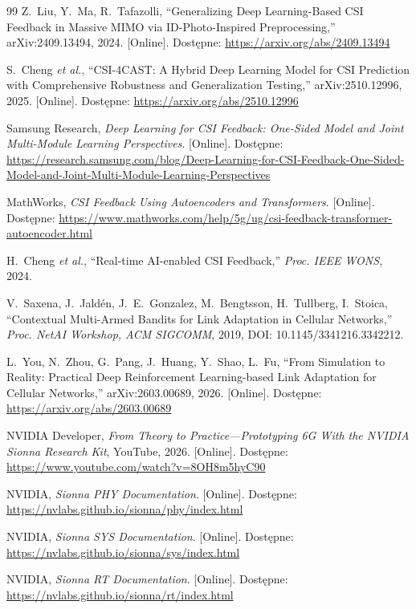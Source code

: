 \documentclass[12pt, a4paper]{article}
\begin{document}
\begin{thebibliography}{99}
Z.~Liu, Y.~Ma, R.~Tafazolli, ``Generalizing Deep Learning-Based CSI Feedback in Massive MIMO via ID-Photo-Inspired Preprocessing,'' arXiv:2409.13494, 2024. [Online]. Dostępne: \url{https://arxiv.org/abs/2409.13494}

S.~Cheng \textit{et al.}, ``CSI-4CAST: A Hybrid Deep Learning Model for CSI Prediction with Comprehensive Robustness and Generalization Testing,'' arXiv:2510.12996, 2025. [Online]. Dostępne: \url{https://arxiv.org/abs/2510.12996}

Samsung Research, \textit{Deep Learning for CSI Feedback: One-Sided Model and Joint Multi-Module Learning Perspectives}. [Online]. Dostępne: \url{https://research.samsung.com/blog/Deep-Learning-for-CSI-Feedback-One-Sided-Model-and-Joint-Multi-Module-Learning-Perspectives}

MathWorks, \textit{CSI Feedback Using Autoencoders and Transformers}. [Online]. Dostępne: \url{https://www.mathworks.com/help/5g/ug/csi-feedback-transformer-autoencoder.html}

H.~Cheng \textit{et al.}, ``Real-time AI-enabled CSI Feedback,'' \textit{Proc. IEEE WONS}, 2024.

V.~Saxena, J.~Jaldén, J.~E.~Gonzalez, M.~Bengtsson, H.~Tullberg, I.~Stoica, ``Contextual Multi-Armed Bandits for Link Adaptation in Cellular Networks,'' \textit{Proc. NetAI Workshop, ACM SIGCOMM}, 2019, DOI: 10.1145/3341216.3342212.

L.~You, N.~Zhou, G.~Pang, J.~Huang, Y.~Shao, L.~Fu, ``From Simulation to Reality: Practical Deep Reinforcement Learning-based Link Adaptation for Cellular Networks,'' arXiv:2603.00689, 2026. [Online]. Dostępne: \url{https://arxiv.org/abs/2603.00689}

NVIDIA Developer, \textit{From Theory to Practice---Prototyping 6G With the NVIDIA Sionna Research Kit}, YouTube, 2026. [Online]. Dostępne: \url{https://www.youtube.com/watch?v=8OH8m5hyC90}

NVIDIA, \textit{Sionna PHY Documentation}. [Online]. Dostępne: \url{https://nvlabs.github.io/sionna/phy/index.html}

NVIDIA, \textit{Sionna SYS Documentation}. [Online]. Dostępne: \url{https://nvlabs.github.io/sionna/sys/index.html}

NVIDIA, \textit{Sionna RT Documentation}. [Online]. Dostępne: \url{https://nvlabs.github.io/sionna/rt/index.html}


\end{thebibliography}
\end{document}

